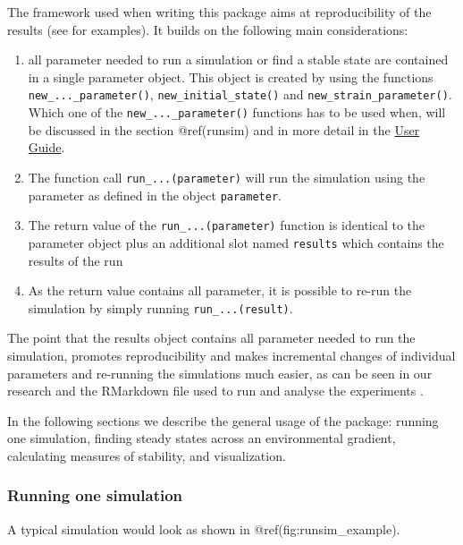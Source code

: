 \documentclass[]{elsarticle} %
\providecommand{\tightlist}{%
  \setlength{\itemsep}{0pt}\setlength{\parskip}{0pt}}
\begin{document}
The framework used when writing this package aims at reproducibility of
the results (see \citep{REF_NEEDED} for examples). It builds on the
following main considerations:

\begin{enumerate}
\def\labelenumi{\arabic{enumi}.}
\tightlist
\item
  all parameter needed to run a simulation or find a stable state are
  contained in a single parameter object. This object is created by
  using the functions \texttt{new\_...\_parameter()},
  \texttt{new\_initial\_state()} and \texttt{new\_strain\_parameter()}.
  Which one of the \texttt{new\_...\_parameter()} functions has to be
  used when, will be discussed in the section @ref(runsim) and in more
  detail in the \href{LINK_NEEDED}{User Guide}.
\item
  The function call \texttt{run\_...(parameter)} will run the simulation
  using the parameter as defined in the object \texttt{parameter}.
\item
  The return value of the \texttt{run\_...(parameter)} function is
  identical to the parameter object plus an additional slot named
  \texttt{results} which contains the results of the run
\item
  As the return value contains all parameter, it is possible to re-run
  the simulation by simply running \texttt{run\_...(result)}.
\end{enumerate}

The point that the results object contains all parameter needed to run
the simulation, promotes reproducibility and makes incremental changes
of individual parameters and re-running the simulations much easier, as
can be seen in our research and the RMarkdown \citep{REF_NEEDED} file
used to run and analyse the experiments \citep{REF_NEEDED}.

In the following sections we describe the general usage of the package:
running one simulation, finding steady states across an environmental
gradient, calculating measures of stability, and visualization.

\hypertarget{running-one-simulation}{%
\subsubsection{Running one simulation}\label{running-one-simulation}}

A typical simulation would look as shown in @ref(fig:runsim\_example).
\end{document}
